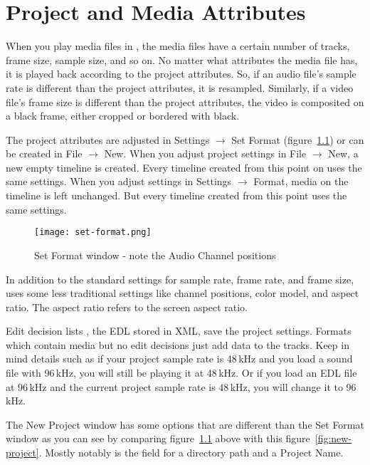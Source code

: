 \chapter{Project and Media Attributes}%
\label{cha:project_and_media_attributes}

When you play media files in \CGG{}, the media files have a certain number of tracks, frame size, sample size, and so on. 
No matter what attributes the media file has, it is played back according to the project attributes. 
So, if an audio file's sample rate is different than the project attributes, it is resampled. 
Similarly, if a video file's frame size is different than the project attributes, the video is composited on a black frame, either cropped or bordered with black.

The project attributes are adjusted in Settings $\rightarrow$ Set Format (figure~\ref{fig:set-format}) or can be created in File $\rightarrow$ New. 
When you adjust project settings in File $\rightarrow$ New, a new empty timeline is created. 
Every timeline created from this point on uses the same settings. 
When you adjust settings in Settings $\rightarrow$ Format, media on the timeline is left unchanged. 
But every timeline created from this point uses the same settings.

\begin{figure}[htpb]
	\centering
	\texttt{[image: set-format.png]}
	\caption{Set Format window - note the Audio Channel positions}
	\label{fig:set-format}
\end{figure}

In addition to the standard settings for sample rate, frame rate, and frame size, \CGG{} uses some less traditional settings like channel positions, color model, and aspect ratio.  
The aspect ratio refers to the screen aspect ratio.

Edit decision lists , the EDL stored in XML, save the project settings.  
Formats which contain media but no edit decisions just add data to the tracks. 
Keep in mind details such as if your project sample rate is 48\,kHz and you load a sound file with 96\,kHz, you will still be playing it at 48\,kHz.  
Or if you load an EDL file at 96\,kHz and the current project sample rate is 48\,kHz, you will change it to 96\,kHz.

The New Project window has some options that are different than the Set Format window as you can see by comparing figure~\ref{fig:set-format} above with this figure~\ref{fig:new-project}. 
Mostly notably is the field for a directory path and a Project Name.

